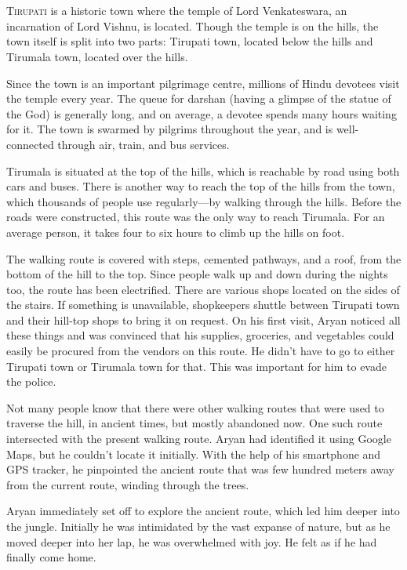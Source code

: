 \chapter{}

\lettrine{T}{irupati} is a historic town where the temple of Lord Venkateswara, an  
incarnation of Lord Vishnu, is located. Though the temple is on the hills, the town itself is split into two parts: Tirupati town, located below the hills and Tirumala town, located over the hills.

Since the town is an important pilgrimage centre, millions of Hindu devotees visit the 
temple every year. The queue for darshan (having a glimpse of the statue of the God) is
generally long, and on average, a devotee spends many hours waiting for
it. The town is swarmed by pilgrims throughout the year, and is well-connected
through air, train, and bus services.

Tirumala is situated at the top of the hills, which is reachable by road using both cars and
buses. There is another way to reach the top of the hills from the town,
which thousands of people use regularly—by walking through the hills. Before
the roads were constructed, this route was the only way to reach Tirumala. For an average
person, it takes four to six hours to climb up the hills on foot.

The walking route is covered with steps, cemented pathways, and a roof, from the bottom
of the hill to the top. Since people walk up and down during the nights too, the
route has been electrified. There are various shops located on the sides of the
stairs. If something is unavailable, shopkeepers shuttle between Tirupati town
and their hill-top shops to bring it on request. On his first visit, Aryan
noticed all these things and was convinced that his supplies, groceries,
and vegetables could easily be procured from the vendors on this route. He didn't
have to go to either Tirupati town or Tirumala town for that. This was important for
him to evade the police.

Not many people know that there were other walking routes that were used to
traverse the hill, in ancient times, but mostly abandoned now. One such
route intersected with the present walking route. Aryan had identified it using
Google Maps, but he couldn't locate it initially. With the help of his
smartphone and GPS tracker, he pinpointed the ancient route that was few hundred
meters away from the current route, winding through the trees.

Aryan immediately set off to explore the ancient route, which led him deeper
into the jungle. Initially he was intimidated by the vast expanse of nature, but
as he moved deeper into her lap, he was overwhelmed with joy. He felt as if he had finally come home.

